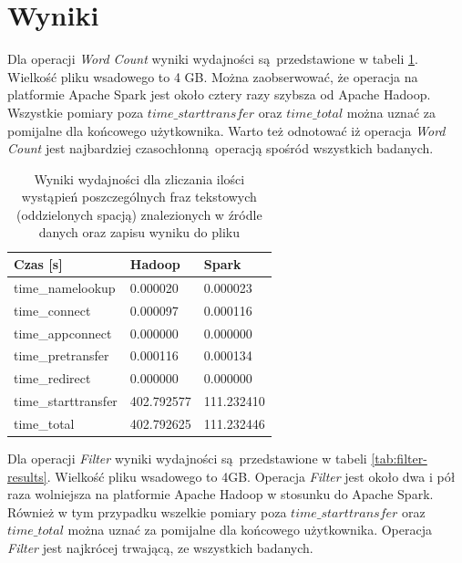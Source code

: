 \section{Wyniki}
Dla operacji \textit{Word Count} wyniki wydajności są przedstawione w tabeli \ref{tab:word-count-results}. Wielkość pliku wsadowego to 4 GB. Można zaobserwować, że operacja na platformie Apache Spark jest około cztery razy szybsza od Apache Hadoop. Wszystkie pomiary poza $time\_starttransfer$ oraz $time\_total$ można uznać za pomijalne dla końcowego użytkownika. Warto też odnotować iż operacja \textit{Word Count} jest najbardziej czasochłonną operacją spośród wszystkich badanych.  
\begin{table}[]
	\centering
	\caption{Wyniki wydajności dla zliczania ilości wystąpień poszczególnych fraz tekstowych (oddzielonych spacją) znalezionych w źródle danych oraz zapisu wyniku do pliku}
	\label{tab:word-count-results}
	\begin{tabular}{|l|l|l|}
		\hline
		Czas [s]    & Hadoop     & Spark      \\ \hline
		time\_namelookup    & 0.000020   & 0.000023   \\ \hline
		time\_connect       & 0.000097   & 0.000116   \\ \hline
		time\_appconnect    & 0.000000   & 0.000000   \\ \hline
		time\_pretransfer   & 0.000116   & 0.000134   \\ \hline
		time\_redirect      & 0.000000   & 0.000000   \\ \hline
		time\_starttransfer & 402.792577 & 111.232410 \\ \hline
		time\_total         & 402.792625 & 111.232446 \\ \hline
	\end{tabular}
\end{table}
\newline Dla operacji \textit{Filter} wyniki wydajności są przedstawione w tabeli \ref{tab:filter-results}. Wielkość pliku wsadowego to 4GB. Operacja \textit{Filter} jest około dwa i pół raza wolniejsza na platformie Apache Hadoop w stosunku do Apache Spark. Również w tym przypadku wszelkie pomiary poza $time\_starttransfer$ oraz $time\_total$ można uznać za pomijalne dla końcowego użytkownika. Operacja \textit{Filter} jest najkrócej trwającą, ze wszystkich badanych. 
